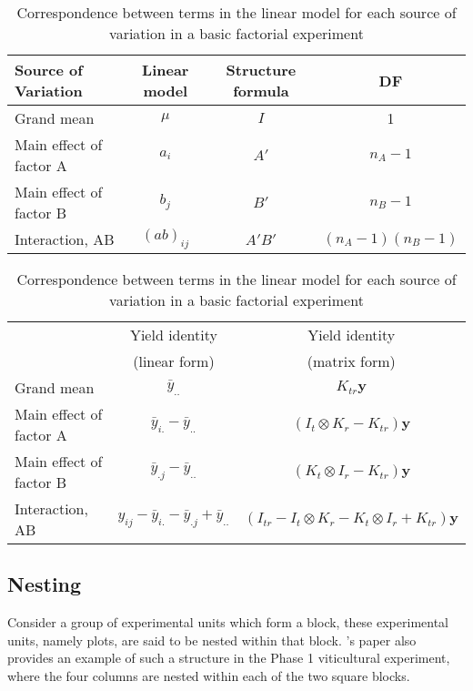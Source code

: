 \documentclass[article]{jss}
\begin{document}
\begin{table}[ht]
\caption{Correspondence between terms in the linear model for each source of variation in a basic factorial experiment}
\centering
\begin{tabular}[t]{lccc}
\hline
\multicolumn{1}{l}{Source of Variation} & \multicolumn{1}{c}{Linear model} & \multicolumn{1}{c}{Structure formula}  & \multicolumn{1}{c}{DF}\\
\hline
Grand mean 				 &$\mu$		  &$I$		& 1 \\
Main effect of factor A  &$a_i$ 	  &$A'$		&$n_A - 1$ \\
Main effect of factor B  &$b_j$ 	  &$B'$		&$n_B - 1$\\
Interaction, AB 		 &$(ab)_{ij}$ &$A'B'$	&$(n_A - 1)(n_B - 1)$   \\
\hline
\end{tabular}
\begin{tabular}[t]{lcc}
\multicolumn{1}{l}{} & \multicolumn{1}{c}{Yield identity}& \multicolumn{1}{c}{Yield identity}\\
\multicolumn{1}{l}{} &  \multicolumn{1}{c}{(linear form)}& \multicolumn{1}{c}{(matrix form)}\\
\hline
Grand mean &$\bar{y}_{..}$ 			&$K_{tr}\bm{y}$\\
Main effect of factor A &$\bar{y}_{i.} - \bar{y}_{..}$ &$(I_{t} \otimes K_{r} - K_{tr})\bm{y}$\\
Main effect of factor B &$\bar{y}_{.j} - \bar{y}_{..}$  &$(K_{t} \otimes I_{r} - K_{tr})\bm{y}$\\
Interaction, AB &$y_{ij} - \bar{y}_{i.} - \bar{y}_{.j} + \bar{y}_{..}$ 			 &$(I_{tr} - I_{t} \otimes K_{r} - K_{t} \otimes I_{r} + K_{tr})\bm{y}$\\
\hline
\end{tabular}
\label{tab:expandCross}
\end{table}

\subsection{Nesting}
Consider a group of experimental units which form a block, these experimental units, namely plots, are said to be nested within that block. \citeauthor{Brien1999}'s paper also provides an example of such a structure in the Phase 1 viticultural experiment, where the four columns are nested within each of the two square blocks.
\end{document}
